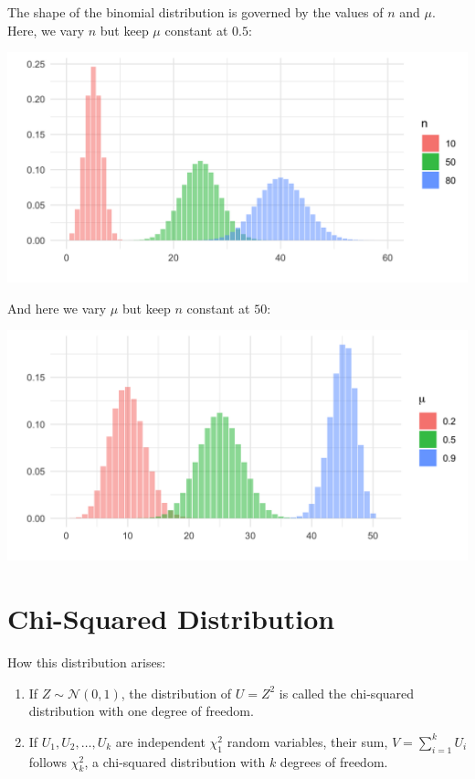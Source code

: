 The shape of the binomial distribution is governed by the values of $n$ and $\mu$. Here, we vary $n$ but keep $\mu$ constant at $0.5$:
\begin{center}
\includegraphics[width=\textwidth]{img/l01-figure3-binom-n-change.png}
\end{center}
And here we vary $\mu$ but keep $n$ constant at $50$:
\begin{center}
\includegraphics[width=\textwidth]{img/l01-figure4-binom-p-change.png}
\end{center}


\section{Chi-Squared Distribution}

How this distribution arises:
\begin{enumerate}
\item If $Z \sim \mathcal{N}(0, 1)$, the distribution of $U = Z^2$ is called the chi-squared distribution with one degree of freedom.
\item If $U_1, U_2, \dots, U_k$ are independent $\chi_1^2$ random variables, their sum,
$ V = \sum_{i=1}^k U_i $
follows $\chi_k^2$, a chi-squared distribution with $k$ degrees of freedom.
\end{enumerate}

